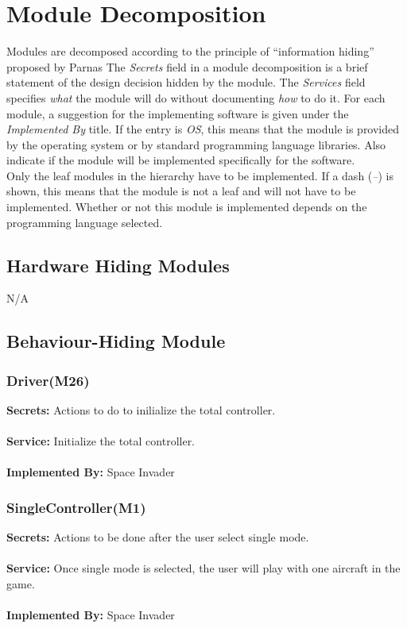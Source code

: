 \documentclass[12pt]{article}
\begin{document}
\section{Module Decomposition} \label{SecMD}

Modules are decomposed according to the principle of ``information hiding''
proposed by Parnas The \emph{Secrets} field in a module
decomposition is a brief statement of the design decision hidden by the
module. The \emph{Services} field specifies \emph{what} the module will do
without documenting \emph{how} to do it. For each module, a suggestion for the
implementing software is given under the \emph{Implemented By} title. If the
entry is \emph{OS}, this means that the module is provided by the operating
system or by standard programming language libraries.  Also indicate if the
module will be implemented specifically for the software.
\\
\noindent 
Only the leaf modules in the
hierarchy have to be implemented. If a dash (\emph{--}) is shown, this means
that the module is not a leaf and will not have to be implemented. Whether or
not this module is implemented depends on the programming language
selected.

\subsection{Hardware Hiding Modules}

N/A

\subsection{Behaviour-Hiding Module}

\subsubsection{Driver(M26)}
\textbf{Secrets:} Actions to do to inilialize the total controller.\\\\
\textbf{Service:} Initialize the total controller.\\\\
\textbf{Implemented By:} Space Invader

\subsubsection{SingleController(M1)}

\textbf{Secrets:} Actions to be done after the user select single mode.\\\\
\textbf{Service:} Once single mode is selected, the user will play with one aircraft in the game.\\\\
\textbf{Implemented By:} Space Invader
\end{document}
